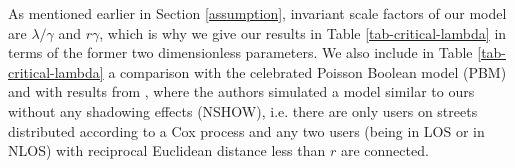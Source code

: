 \documentclass[conference]{IEEEtran}
\begin{document}
As mentioned earlier in Section \ref{assumption}, invariant scale factors of our model are $\lambda / \gamma$ and $r\gamma$, which is why we give our results in Table \ref{tab-critical-lambda} in terms of the former two dimensionless parameters. We also include in Table \ref{tab-critical-lambda} a comparison with the celebrated Poisson Boolean model (PBM) \cite[Table 2]{balister_continuum_2005} and with results from \cite{cali2018percolation}, where the authors simulated a model similar to ours without any shadowing effects (NSHOW), i.e. there are only users on streets distributed according to a Cox process and any two users (being in LOS or in NLOS) with reciprocal Euclidean distance less than $r$ are connected. \\
\end{document}
